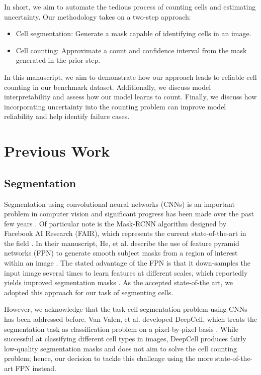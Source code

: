 \documentclass[10pt,twocolumn,letterpaper]{article}
\begin{document}
In short, we aim to automate the tedious process of counting cells and estimating uncertainty.
Our methodology takes on a two-step approach:

\begin{itemize}\itemsep=2pt
\item Cell segmentation: Generate a mask capable of identifying cells in an image. 
\item Cell counting: Approximate a count and confidence interval from the mask generated in the prior step.
\end{itemize}

In this manuscript, we aim to demonstrate how our approach leads to reliable cell counting in our benchmark dataset.
Additionally, we discuss model interpretability and assess how our model learns to count.
Finally, we discuss how incorporating uncertainty into the counting problem can improve model reliability and help
identify failure cases.

\section{Previous Work}

\subsection{Segmentation}

Segmentation using convolutional neural networks (CNNs) is an important problem in computer vision and
significant progress has been made over the past few years \cite{deepmask, sharpmask, fastrcnn, fasterrcnn, fpn2016, maskrcnn2017}.
Of particular note is the Mask-RCNN algorithm designed by Facebook AI Research (FAIR), which represents the current state-of-the-art
in the field \cite{maskrcnn2017}. In their manuscript, He, et al. describe the use of feature pyramid networks (FPN) to generate
smooth subject masks from a region of interest within an image \cite{maskrcnn2017, fpn2016}. The stated advantage of the FPN is
that it down-samples the input image several times to learn features at different scales, which reportedly yields improved
segmentation masks \cite{fpn2016}. As the accepted state-of-the art, we adopted this approach for our task of segmenting cells.

However, we acknowledge that the task cell segmentation problem using CNNs has been addressed before.
Van Valen, et al. developed DeepCell, which treats the segmentation task as classification problem on a
pixel-by-pixel basis \cite{deepcell}. While successful at classifying different cell types in images,
DeepCell produces fairly low-quality segmentation masks and does not aim to solve the cell counting problem;
hence, our decision to tackle this challenge using the more state-of-the-art FPN instead.
\end{document}
